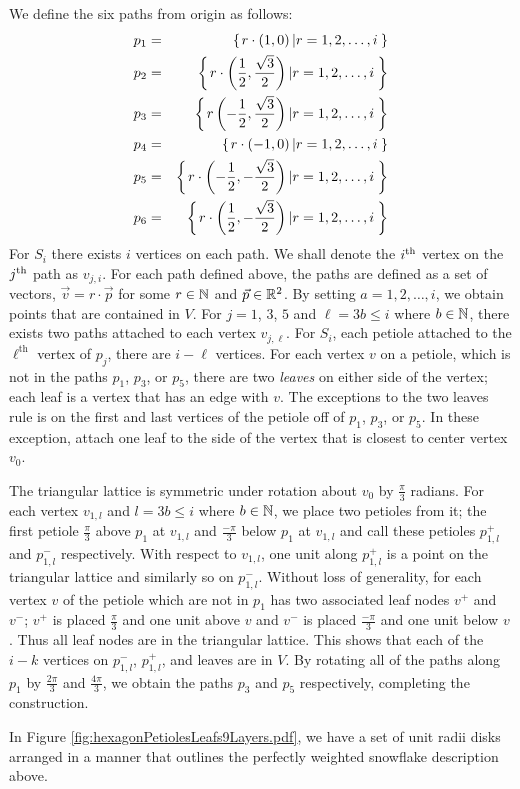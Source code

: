 We define the six paths from origin as follows:      
\begin{eqnarray*}
p_1 &=& {\left\lbrace \left. r\cdot\left( 1,0 \right) \left\vert r = 1,2,\dots, i \right.\right.\right\rbrace }\\
p_2 &=& {\left\lbrace \left. r\cdot\left( \frac{1}{2},\frac{\sqrt{3}}{2} \right) \left\vert r = 1,2,\dots, i \right.\right.\right\rbrace }\\
p_3 &=& {\left\lbrace \left. r\left( -\frac{1}{2},\frac{\sqrt{3}}{2} \right) \left\vert r = 1,2,\dots, i \right.\right.\right\rbrace }\\
p_4 &=& {\left\lbrace \left. r \cdot \left( -1,0 \right) \left\vert r = 1,2,\dots, i \right.\right.\right\rbrace }\\
p_5 &=& {\left\lbrace \left. r \cdot \left( -\frac{1}{2},-\frac{\sqrt{3}}{2} \right) \left\vert r = 1,2,\dots, i \right.\right.\right\rbrace }\\
p_6 &=& {\left\lbrace \left. r \cdot \left( \frac{1}{2}, -\frac{\sqrt{3}}{2} \right) \left\vert r = 1,2,\dots, i \right.\right.\right\rbrace }
\end{eqnarray*}
For $S_i$ there exists $i$ vertices on each path.  We shall denote the $i^\text{th}$ vertex on the $j^\text{th}$ path as $v_{j,i}$.  
For each path defined above, the paths are defined as a set of vectors, $\vec{v} = r \cdot \vec{p}$  for some $r \in {\mathbb{N}}$ and $\vec{p} \in {\mathbb{R}}^2$.  
By setting $a = 1,2,\dots, i$, we obtain points that are contained in $V$.  
For $j = 1$, $3$, $5$ and $\ell = 3 b \leq i$ where $b \in {\mathbb{N}}$,  there exists two paths attached to each vertex $v_{j,\ell}$.  
For $S_i$, each petiole attached to the $\ell^\text{th}$ vertex of $p_j$, there are $i-\ell$ vertices. 
For each vertex $v$ on a petiole, which is not in the paths $p_1$, $p_3$, or $p_5$, there are two \textit{leaves} on either side of the vertex; each leaf is a vertex that has an edge with $v$.  
The exceptions to the two leaves rule is on the first and last vertices of the petiole off of $p_1$, $p_3$, or $p_5$.  
In these exception, attach one leaf to the side of the vertex that is closest to center vertex $v_0$.

The triangular lattice is symmetric under rotation about $v_0$ by $\frac{\pi}{3}$ radians.  
For each vertex $v_{1,l}$ and $l = 3 b \leq i$ where $b \in {\mathbb{N}}$, we place two petioles from it; the first petiole $\frac{\pi}{3}$ above $p_1$ at $v_{1,l}$ and $\frac{-\pi}{3}$ below $p_1$ at $v_{1,l}$ and call these petioles $p_{1,l}^+$ and $p_{1,l}^-$ respectively.  
With respect to $v_{1,l}$, one unit along $p_{1,l}^+$ is a point on the triangular lattice and similarly so on $p_{1,l}^-$.  
Without loss of generality, for each vertex $v$ of the petiole which are not in $p_1$ has two associated leaf nodes $v^+$ and $v^-$; $v^+$ is placed $\frac{\pi}{3}$ and one unit above $v$ and $v^-$ is placed $\frac{-\pi}{3}$ and one unit below $v$.  
Thus all leaf nodes are in the triangular lattice.
This shows that each of the $i-k$ vertices on $p_{1,l}^-$, $p_{1,l}^+$, and leaves are in $V$.
By rotating all of the paths along $p_1$ by $\frac{2\pi}{3}$ and $\frac{4\pi}{3}$, we obtain the paths $p_3$ and $p_5$ respectively, completing the construction.

In Figure \ref{fig:hexagonPetiolesLeafs9Layers.pdf}, we have a set of unit radii disks arranged in a manner that outlines the perfectly weighted snowflake description above.
